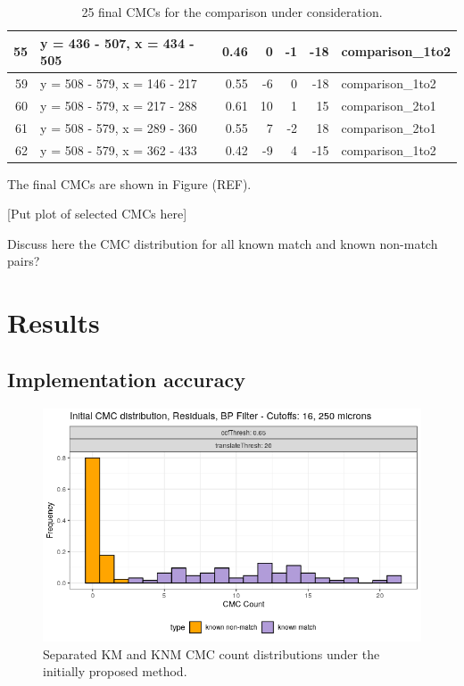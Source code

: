 \begin{table}[htbp]
\begin{tabular}{|r|l|r|r|r|r|l|}
\hline
55 & y = 436 - 507, x = 434 - 505 & 0.46 & 0 & -1 & -18 & comparison\_1to2\\
\hline
59 & y = 508 - 579, x = 146 - 217 & 0.55 & -6 & 0 & -18 & comparison\_1to2\\
\hline
60 & y = 508 - 579, x = 217 - 288 & 0.61 & 10 & 1 & 15 & comparison\_2to1\\
\hline
61 & y = 508 - 579, x = 289 - 360 & 0.55 & 7 & -2 & 18 & comparison\_2to1\\
\hline
62 & y = 508 - 579, x = 362 - 433 & 0.42 & -9 & 4 & -15 & comparison\_1to2\\
\hline
\end{tabular}
    \caption{25 final CMCs for the comparison under consideration.}
    \label{tab:km1_unknown2_finalCMC}
\end{table}

The final CMCs are shown in Figure (REF).

[Put plot of selected CMCs here]

Discuss here the CMC distribution for all known match and known non-match pairs?



\section{Results}

\subsection{Implementation accuracy}

\begin{figure}[htbp]
  \centering
	\includegraphics[width = .7\textwidth]{./images/initialCMCdistributions_perfectClassification.png}
	\caption{Separated KM and KNM CMC count distributions under the initially proposed method.}
 	\label{figure:initialMethodPerfectIdentification}
\end{figure}

